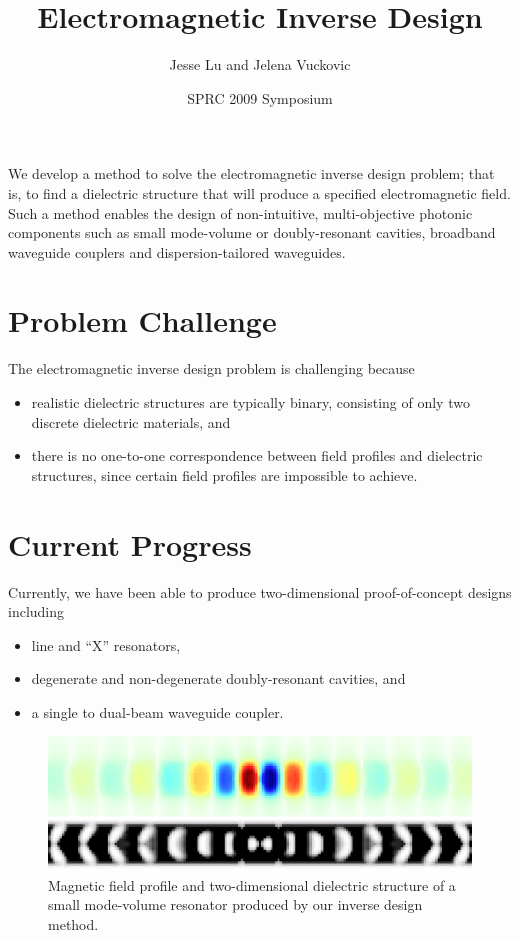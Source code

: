 \documentclass{article}
\title{Electromagnetic Inverse Design}
\author{Jesse Lu and Jelena Vuckovic}
\date{SPRC 2009 Symposium}
\begin{document}
\maketitle %
\thispagestyle{empty} %
\noindent{}%

We develop a method to solve the electromagnetic inverse design problem; that is, to find a dielectric structure that will produce a specified electromagnetic field. Such a method enables the design of non-intuitive, multi-objective photonic components such as small mode-volume or doubly-resonant cavities, broadband waveguide couplers and dispersion-tailored waveguides.

\section*{Problem Challenge}
The electromagnetic inverse design problem is challenging because
\begin{itemize}
\item realistic dielectric structures are typically binary, consisting of only two discrete dielectric materials, and
\item there is no one-to-one correspondence between field profiles and dielectric structures, since certain field profiles are impossible to achieve.
\end{itemize}

\newpage
\section*{Current Progress}
Currently, we have been able to produce two-dimensional proof-of-concept designs including
\begin{itemize}
\item line and ``X'' resonators,
\item degenerate and non-degenerate doubly-resonant cavities, and
\item a single to dual-beam waveguide coupler.
\end{itemize}

\begin{figure}[h!]
\centering
\includegraphics[width=1.0\textwidth]{fig2}
\caption{Magnetic field profile and two-dimensional dielectric structure of a small mode-volume resonator produced by our inverse design method.}
\end{figure}
	 
\end{document}
